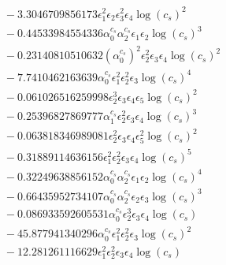 \documentclass[10pt]{article}
\begin{document}
\begin{align*}
&{}  - 3.3046709856173 \epsilon_{1}^{2} \epsilon_{2} \epsilon_{3}^{2} \epsilon_{4} \log{\left(c_{s} \right)}^{2} \\
&{}  - 0.44533984554336 \alpha_{0}^{c_s} \alpha_{2}^{c_s} \epsilon_{1} \epsilon_{2} \log{\left(c_{s} \right)}^{3} \\
&{}  - 0.23140810510632 \left(\alpha_{0}^{c_s}\right)^{2} \epsilon_{2}^{2} \epsilon_{3} \epsilon_{4} \log{\left(c_{s} \right)}^{2} \\
&{}  - 7.7410462163639 \alpha_{0}^{c_s} \epsilon_{1}^{2} \epsilon_{2}^{2} \epsilon_{3} \log{\left(c_{s} \right)}^{4} \\
&{}  - 0.061026516259998 \epsilon_{2}^{3} \epsilon_{3} \epsilon_{4} \epsilon_{5} \log{\left(c_{s} \right)}^{2} \\
&{}  - 0.25396827869777 \alpha_{1}^{c_s} \epsilon_{2}^{2} \epsilon_{3} \epsilon_{4} \log{\left(c_{s} \right)}^{3} \\
&{}  - 0.063818346989081 \epsilon_{2}^{2} \epsilon_{3} \epsilon_{4} \epsilon_{5}^{2} \log{\left(c_{s} \right)}^{2} \\
&{}  - 0.31889114636156 \epsilon_{1}^{2} \epsilon_{2}^{2} \epsilon_{3} \epsilon_{4} \log{\left(c_{s} \right)}^{5} \\
&{}  - 0.32249638856152 \alpha_{0}^{c_s} \alpha_{2}^{c_s} \epsilon_{1} \epsilon_{2} \log{\left(c_{s} \right)}^{4} \\
&{}  - 0.66435952734107 \alpha_{0}^{c_s} \alpha_{2}^{c_s} \epsilon_{2} \epsilon_{3} \log{\left(c_{s} \right)}^{3} \\
&{}  - 0.086933592605531 \alpha_{0}^{c_s} \epsilon_{2}^{3} \epsilon_{3} \epsilon_{4} \log{\left(c_{s} \right)} \\
&{}  - 45.877941340296 \alpha_{0}^{c_s} \epsilon_{1}^{2} \epsilon_{2}^{2} \epsilon_{3} \log{\left(c_{s} \right)}^{2} \\
&{}  - 12.281261116629 \epsilon_{1}^{2} \epsilon_{2}^{2} \epsilon_{3} \epsilon_{4} \log{\left(c_{s} \right)}
\end{align*}
\end{document}

